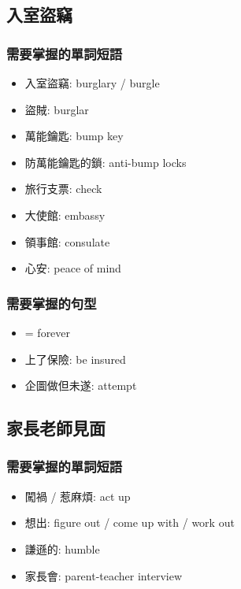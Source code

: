 \subsection{入室盜竊}
\subsubsection*{需要掌握的單詞短語}
\begin{multicols}{3}
\begin{itemize}
  \itemsep0em
  \item 入室盜竊: burglary / burgle
  \item 盜賊: burglar
  \item 萬能鑰匙: bump key
  \item 防萬能鑰匙的鎖: anti-bump locks
  \item 旅行支票:  check
  \item 大使館: embassy
  \item 領事館: consulate
  \item 心安: peace of mind
\end{itemize}
\end{multicols}

\subsubsection*{需要掌握的句型}
\begin{multicols}{3}
\begin{itemize}
  \itemsep0em
  \item {} = forever
  \item 上了保險: be insured
  \item 企圖做但未遂: attempt
\end{itemize}
\end{multicols}

\subsection{家長老師見面}
\subsubsection*{需要掌握的單詞短語}
\begin{multicols}{2}
\begin{itemize}
  \itemsep0em
  \item 闖禍 / 惹麻煩: act up
  \item 想出: figure out / come up with / work out
  \item 謙遜的: humble
  \item 家長會: parent-teacher interview
\end{itemize}
\end{multicols}

